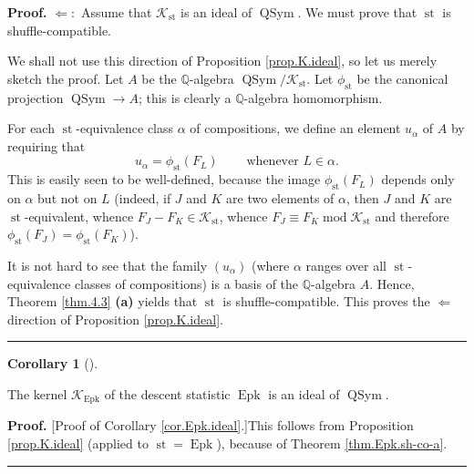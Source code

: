 \documentclass[numbers=enddot,12pt,final,onecolumn,notitlepage]{scrartcl}%
\theoremstyle{definition}
\newtheorem{coro}[theo]{Corollary}
\newenvironment{corollary}[1][]
{\begin{coro}[#1]\begin{leftbar}}
{\end{leftbar}\end{coro}}
\newenvironment{proof}[1][Proof]{\noindent\textbf{#1.} }{\ \rule{0.5em}{0.5em}}
\newenvironment{verlong}{}{}
\begin{document}
\begin{verlong}
\begin{proof}
$\Longleftarrow:$ Assume that $\mathcal{K}_{\operatorname{st}}$ is an ideal
of $\operatorname*{QSym}$. We must prove that $\operatorname{st}$ is shuffle-compatible.

We shall not use this direction of Proposition \ref{prop.K.ideal}, so let us
merely sketch the proof. Let $A$ be the $\mathbb{Q}$-algebra
$\operatorname*{QSym}/\mathcal{K}_{\operatorname{st}}$. Let $\phi
_{\operatorname{st}}$ be the canonical projection $\operatorname*{QSym}%
\rightarrow A$; this is clearly a $\mathbb{Q}$-algebra homomorphism.

For each $\operatorname{st}$-equivalence class $\alpha$ of compositions, we
define an element $u_{\alpha}$ of $A$ by requiring that%
\[
u_{\alpha}=\phi_{\operatorname{st}}\left(  F_{L}\right)
\ \ \ \ \ \ \ \ \ \ \text{whenever }L\in\alpha.
\]
This is easily seen to be well-defined, because the image $\phi
_{\operatorname{st}}\left(  F_{L}\right)  $ depends only on $\alpha$ but not
on $L$ (indeed, if $J$ and $K$ are two elements of $\alpha$, then $J$ and $K$
are $\operatorname{st}$-equivalent, whence $F_{J}-F_{K}\in\mathcal{K}%
_{\operatorname{st}}$, whence $F_{J}\equiv F_{K}\operatorname{mod}
\mathcal{K}_{\operatorname{st}}$ and therefore $\phi_{\operatorname{st}}
\left(  F_{J}\right)  =\phi_{\operatorname{st}}\left(  F_{K}\right)  $).

It is not hard to see that the family $\left(  u_{\alpha}\right)  $ (where
$\alpha$ ranges over all $\operatorname{st}$-equivalence classes of
compositions) is a basis of the $\mathbb{Q}$-algebra $A$. Hence, Theorem
\ref{thm.4.3} \textbf{(a)} yields that $\operatorname{st}$ is
shuffle-compatible. This proves the $\Longleftarrow$ direction of Proposition
\ref{prop.K.ideal}.
\end{proof}
\end{verlong}

\begin{corollary}
\label{cor.Epk.ideal}The kernel $\mathcal{K}_{\operatorname{Epk}}$ of the
descent statistic $\operatorname{Epk}$ is an ideal of $\operatorname*{QSym}$.
\end{corollary}

\begin{verlong}
\begin{proof}
[Proof of Corollary \ref{cor.Epk.ideal}.]This follows from Proposition
\ref{prop.K.ideal} (applied to $\operatorname{st}=\operatorname{Epk}$),
because of Theorem \ref{thm.Epk.sh-co-a}.
\end{proof}
\end{verlong}
\end{document}
